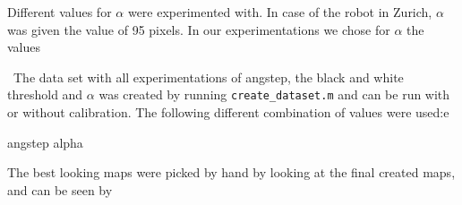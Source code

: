 \documentclass[a4paper, 20pt]{report}
\begin{document}
Different values for $\alpha$ were experimented with. In case of the robot in
Zurich, $\alpha$ was given the value of 95 pixels. In our experimentations we
chose for $\alpha$ the values

\
The data set with all experimentations of angstep, the black and white
threshold and  $\alpha$ was created by running \texttt{create\_dataset.m} and can be run with
or without calibration. The following different combination of values were used:e

angstep
alpha

The best looking maps were picked by hand  by looking at the final created maps,  and can be seen by
\end{document}

